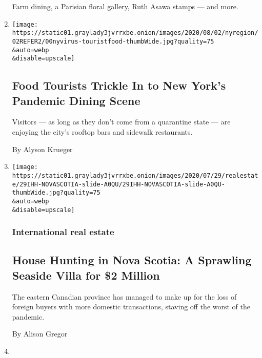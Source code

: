 \begin{enumerate}
  Farm dining, a Parisian floral gallery, Ruth Asawa stamps --- and
  more.
\item
  \href{/2020/07/30/nyregion/coronavirus-nyc-tourism-restaurants.html}{}

  \texttt{[image: https://static01.graylady3jvrrxbe.onion/images/2020/08/02/nyregion/02REFER2/00nyvirus-touristfood-thumbWide.jpg?quality=75\\\&auto=webp\\\&disable=upscale]}

  \hypertarget{food-tourists-trickle-in-to-new-yorks-pandemic-dining-scene}{%
  \subsection{Food Tourists Trickle In to New York's Pandemic Dining
  Scene}\label{food-tourists-trickle-in-to-new-yorks-pandemic-dining-scene}}

  Visitors --- as long as they don't come from a quarantine state ---
  are enjoying the city's rooftop bars and sidewalk restaurants.

  By Alyson Krueger
\item
  \href{/2020/07/29/realestate/house-hunting-in-nova-scotia-a-sprawling-seaside-villa-for-2-million.html}{}

  \texttt{[image: https://static01.graylady3jvrrxbe.onion/images/2020/07/29/realestate/29IHH-NOVASCOTIA-slide-A0QU/29IHH-NOVASCOTIA-slide-A0QU-thumbWide.jpg?quality=75\\\&auto=webp\\\&disable=upscale]}

  \hypertarget{international-real-estate}{%
  \subsubsection{International real
  estate}\label{international-real-estate}}

  \hypertarget{house-hunting-in-nova-scotia-a-sprawling-seaside-villa-for-2-million}{%
  \subsection{House Hunting in Nova Scotia: A Sprawling Seaside Villa
  for \$2
  Million}\label{house-hunting-in-nova-scotia-a-sprawling-seaside-villa-for-2-million}}

  The eastern Canadian province has managed to make up for the loss of
  foreign buyers with more domestic transactions, staving off the worst
  of the pandemic.

  By Alison Gregor
\item
  \href{/2020/07/29/nyregion/lake-solitude-closed-racism.html}{}


\end{enumerate}

